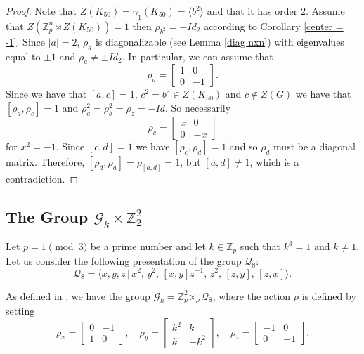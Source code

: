 \documentclass[a4paper, english, 9pt]{amsart}
\theoremstyle{plain}
\theoremstyle{definition}
\def\setof#1#2{\{#1\,\colon\,#2\}}
\def\Z{\mathbb Z}
\begin{document}
    \begin{proof}
 Note that $Z(K_{50})=\gamma_1(K_{50})=\langle b^2\rangle$ and that it has order $2$. Assume that $Z(\Z_p^n\rtimes Z(K_{50}))= 1$ then $\rho_{b^2}=-Id_2$ according to Corollary \ref{center = -1}. Since $|a|=2$, $\rho_a$ is diagonalizable (see Lemma \ref{diag nxn}) with eigenvalues equal to $\pm 1$ and $\rho_a\neq \pm Id_2$. In particular, we can assume that 
$$\rho_a=\begin{bmatrix}
1 & 0\\
0 & -1
\end{bmatrix}.$$ 
Since we have that $[a,c]=1$, $c^2=b^2\in Z(K_{50})$ and $c\notin Z(G)$ we have that $[\rho_a,\rho_c]=1$ and $\rho_a^2=\rho_b^2=\rho_z=-Id$. So necessarily  $$\rho_c=\begin{bmatrix}
    x &0 \\
    0 & -x
\end{bmatrix}$$
for $x^2=-1$. Since $[c,d]=1$ we have $[\rho_c,\rho_d]=1$ and so $\rho_d$ must be a diagonal matrix. Therefore, $[\rho_d,\rho_a]=\rho_{[a,d]}=1$, but $[a,d]\neq 1$, which is a contradiction. 
\end{proof}

\subsection{The Group \texorpdfstring{$\mathcal{G}_k\times \Z_2^2$}{GkxZ2xZ2}}\label{grup for sr}

Let $p=1\pmod{3}$ be a prime number and let $k\in \Z_p$ such that $k^3=1$ and $k\neq 1$. Let us consider the following presentation of the group $\mathcal{Q}_8$:
$$\mathcal{Q}_8=\langle x,y,z\,|\, x^2,\, y^2,\, [x,y]z^{-1},\, z^2,\,[z,y],\,[z,x]\rangle.$$

As defined in \cite[Section 7]{LSS}, we have the group $\mathcal{G}_k=\mathbb{Z}_p^2\rtimes_{\rho} \mathcal{Q}_8$, where the action $\rho$ is defined by setting
\begin{displaymath}
\rho_x=\begin{bmatrix}
0 & -1\\
1 & 0
\end{bmatrix},\quad
\rho_{y}=\begin{bmatrix}
k^2 & k\\
k & -k^2
\end{bmatrix},\quad \rho_z=\begin{bmatrix}
-1 & 0\\
0 & -1
\end{bmatrix}.
\end{displaymath}
\end{document}
